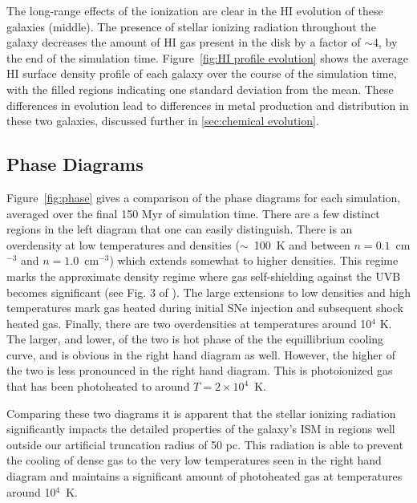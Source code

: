 \documentclass[twocolumn]{aastex61}
\begin{document}
The long-range effects of the ionization are clear in the HI evolution of these galaxies (middle). The presence of stellar ionizing radiation throughout the galaxy decreases the amount of HI gas present in the disk by a factor of $\sim$4, by the end of the simulation time. Figure~\ref{fig:HI profile evolution} shows the average HI surface density profile of each galaxy over the course of the simulation time, with the filled regions indicating one standard deviation from the mean. These differences in evolution lead to differences in metal production and distribution in these two galaxies, discussed further in \ref{sec:chemical evolution}.


\subsection{Phase Diagrams}
\label{sec:phase}

Figure~\ref{fig:phase} gives a comparison of the phase diagrams for each simulation, averaged over the final 150 Myr of simulation time. There are a few distinct regions in the left diagram that one can easily distinguish. There is an overdensity at low temperatures and densities ($\sim$~100~K and between $n = 0.1$~cm$^{-3}$ and $n = 1.0$~cm$^{-3}$) which extends somewhat to higher densities. This regime marks the approximate density regime where gas self-shielding against the UVB becomes significant (see Fig. 3 of \citet{Rahmati2013}). The large extensions to low densities and high temperatures mark gas heated during initial SNe injection and subsequent shock heated gas. Finally, there are two overdensities at temperatures around 10$^{4}$ K. The larger, and lower, of the two is hot phase of the the equillibrium cooling curve, and is obvious in the right hand diagram as well. However, the higher of the two is less pronounced in the right hand diagram. This is photoionized gas that has been photoheated to around $T = 2\times 10^4$~K.

Comparing these two diagrams it is apparent that the stellar ionizing radiation significantly impacts the detailed properties of the galaxy's ISM in regions well outside our artificial truncation radius of 50 pc. This radiation is able to prevent the cooling of dense gas to the very low temperatures seen in the right hand diagram and maintains a significant amount of photoheated gas at temperatures around 10$^4$~K.  
\end{document}
